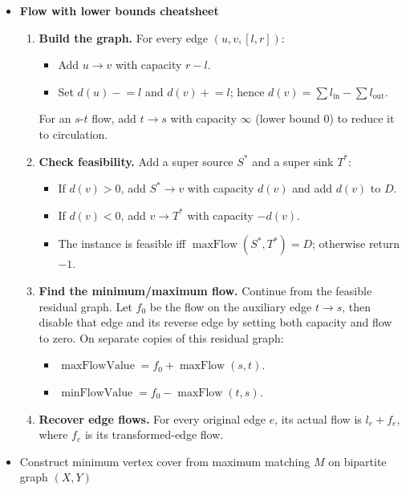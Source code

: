 \normalsize
\begin{itemize}

    \item \textbf{Flow with lower bounds cheatsheet}

    \begin{enumerate}
        \item \textbf{Build the graph.} For every edge $(u,v,[l,r])$:
        \begin{itemize}
            \item Add $u \rightarrow v$ with capacity $r-l$.
            \item Set $d(u) \mathrel{-}= l$ and $d(v) \mathrel{+}= l$; hence
            $d(v)=\sum l_{\mathrm{in}}-\sum l_{\mathrm{out}}$.
        \end{itemize}
        For an $s$-$t$ flow, add $t \rightarrow s$ with capacity $\infty$
        (lower bound $0$) to reduce it to circulation.

        \item \textbf{Check feasibility.} Add a super source $S^\ast$ and a
        super sink $T^\ast$:
        \begin{itemize}
            \item If $d(v)>0$, add $S^\ast \rightarrow v$ with capacity $d(v)$
            and add $d(v)$ to $D$.
            \item If $d(v)<0$, add $v \rightarrow T^\ast$ with capacity $-d(v)$.
            \item The instance is feasible iff
            $\operatorname{maxFlow}(S^\ast,T^\ast)=D$; otherwise return $-1$.
        \end{itemize}

        \item \textbf{Find the minimum/maximum flow.} Continue from the feasible
        residual graph. Let $f_0$ be the flow on the auxiliary edge
        $t \rightarrow s$, then disable that edge and its reverse edge by setting
        both capacity and flow to zero. On separate copies of this residual graph:
        \begin{itemize}
            \item $\operatorname{maxFlowValue}=f_0+\operatorname{maxFlow}(s,t)$.
            \item $\operatorname{minFlowValue}=f_0-\operatorname{maxFlow}(t,s)$.
        \end{itemize}

        \item \textbf{Recover edge flows.} For every original edge $e$,
        its actual flow is $l_e+f_e$, where $f_e$ is its transformed-edge flow.
    \end{enumerate}
    \item Construct minimum vertex cover from maximum matching $M$ on bipartite graph $(X, Y)$


\end{itemize}
